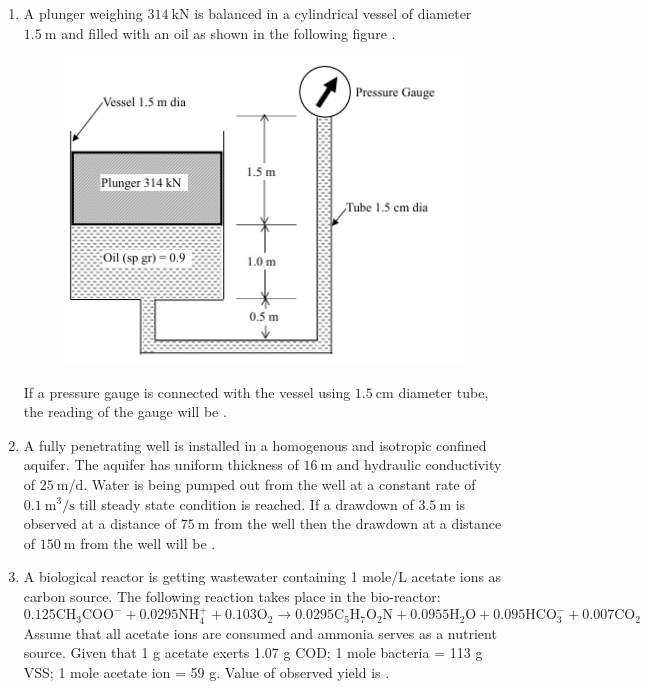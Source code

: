 \documentclass[journal,12pt,onecolumn]{IEEEtran}
\theoremstyle{remark}
\begin{document}
\begin{enumerate}
\newpage

\item A plunger weighing $314\ \text{kN}$ is balanced in a cylindrical vessel of diameter $1.5\ \text{m}$ and filled with an oil  as shown in the following figure .

\begin{center}
\begin{figure}[h]
    \centering
    \includegraphics[width=0.5\linewidth]{figs/img 5 (2).jpeg}
    \caption{}
    \label{fig:placeholder}
\end{figure}

\end{center}

If a pressure gauge is connected with the vessel using $1.5\ \text{cm}$ diameter tube, the reading of the gauge will be \underline{\hspace{2cm}} . \hfill{}

\item A fully penetrating well is installed in a homogenous and isotropic confined aquifer. The aquifer has uniform thickness of $16\ \text{m}$ and hydraulic conductivity of $25\ \text{m/d}$. Water is being pumped out from the well at a constant rate of $0.1\ \text{m}^3/\text{s}$ till steady state condition is reached. If a drawdown of $3.5\ \text{m}$ is observed at a distance of $75\ \text{m}$ from the well then the drawdown at a distance of $150\ \text{m}$ from the well will be \underline{\hspace{2cm}} . \hfill{}

\newpage

\item A biological reactor is getting wastewater containing 1 mole/L acetate ions as carbon source. The following reaction takes place in the bio-reactor:
\[
0.125\mathrm{CH_3COO^-} + 0.0295\mathrm{NH_4^+} + 0.103\mathrm{O_2} \rightarrow 0.0295\mathrm{C_5H_7O_2N} + 0.0955\mathrm{H_2O} + 0.095\mathrm{HCO_3^-} + 0.007\mathrm{CO_2}
\]
Assume that all acetate ions are consumed and ammonia serves as a nutrient source. Given that 1 g acetate exerts 1.07 g COD; 1 mole bacteria = 113 g VSS; 1 mole acetate ion = 59 g. Value of observed yield is \underline{\hspace{2cm}} .  
\hfill{}


\end{enumerate}
\end{document}
